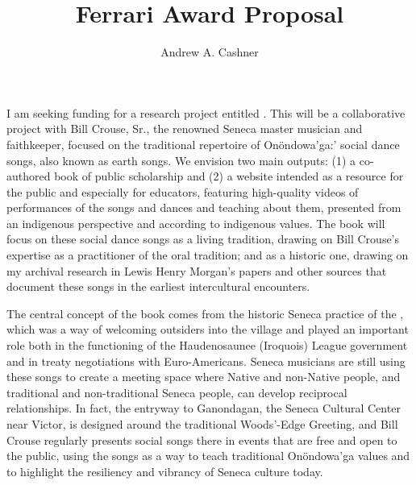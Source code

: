 \documentclass[12pt]{article}
\title{Ferrari Award Proposal}
\author{Andrew A. Cashner}
\begin{document}
\maketitle

I am seeking funding for a research project entitled .
This will be a collaborative project with Bill Crouse, Sr., the renowned
Seneca master musician and faithkeeper, focused on the traditional repertoire
of Onöndowa'ga:' social dance songs, also known as earth songs.
We envision two main outputs: (1) a co-authored book of public scholarship and
(2) a website intended as a resource for the public and especially for
educators, featuring high-quality videos of performances of the songs and
dances and teaching about them, presented from an indigenous perspective and
according to indigenous values.
The book will focus on these social dance songs as a living tradition, drawing
on Bill Crouse’s expertise as a practitioner of the oral tradition; and as a
historic one, drawing on my archival research in Lewis Henry Morgan’s papers
and other sources that document these songs in the earliest intercultural
encounters. 

The central concept of the book comes from the historic Seneca practice of the
, which was a way of welcoming outsiders into the
village and played an important role both in the functioning of the
Haudenosaunee (Iroquois) League government and in treaty negotiations with
Euro-Americans.
Seneca musicians are still using these songs to create a meeting space where
Native and non-Native people, and traditional and non-traditional Seneca
people, can develop reciprocal relationships.
In fact, the entryway to Ganondagan, the Seneca Cultural Center near Victor,
is designed around the traditional Woods'-Edge Greeting, and Bill Crouse
regularly presents social songs there in events that are free and open to the
public, using the songs as a way to teach traditional Onöndowa'ga values and
to highlight the resiliency and vibrancy of Seneca culture today.
\end{document}
